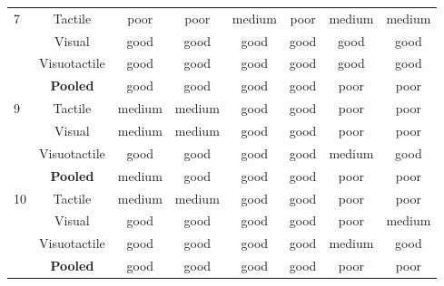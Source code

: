 \begin{longtable}{lccccccc}
7 & Tactile & \cellcolor{red!15}poor & \cellcolor{red!15}poor & \cellcolor{yellow!25}medium & \cellcolor{red!15}poor & \cellcolor{yellow!25}medium & \cellcolor{yellow!25}medium \\
 & Visual & \cellcolor{green!15}good & \cellcolor{green!15}good & \cellcolor{green!15}good & \cellcolor{green!15}good & \cellcolor{green!15}good & \cellcolor{green!15}good \\
 & Visuotactile & \cellcolor{green!15}good & \cellcolor{green!15}good & \cellcolor{green!15}good & \cellcolor{green!15}good & \cellcolor{green!15}good & \cellcolor{green!15}good \\
\textbf{} & \textbf{Pooled} & \cellcolor{green!15}good & \cellcolor{green!15}good & \cellcolor{green!15}good & \cellcolor{green!15}good & \cellcolor{red!15}poor & \cellcolor{red!15}poor \\
9 & Tactile & \cellcolor{yellow!25}medium & \cellcolor{yellow!25}medium & \cellcolor{green!15}good & \cellcolor{green!15}good & \cellcolor{red!15}poor & \cellcolor{red!15}poor \\
 & Visual & \cellcolor{yellow!25}medium & \cellcolor{yellow!25}medium & \cellcolor{green!15}good & \cellcolor{green!15}good & \cellcolor{red!15}poor & \cellcolor{red!15}poor \\
 & Visuotactile & \cellcolor{green!15}good & \cellcolor{green!15}good & \cellcolor{green!15}good & \cellcolor{green!15}good & \cellcolor{yellow!25}medium & \cellcolor{green!15}good \\
\textbf{} & \textbf{Pooled} & \cellcolor{yellow!25}medium & \cellcolor{green!15}good & \cellcolor{green!15}good & \cellcolor{green!15}good & \cellcolor{red!15}poor & \cellcolor{red!15}poor \\
10 & Tactile & \cellcolor{yellow!25}medium & \cellcolor{yellow!25}medium & \cellcolor{green!15}good & \cellcolor{green!15}good & \cellcolor{red!15}poor & \cellcolor{red!15}poor \\
 & Visual & \cellcolor{green!15}good & \cellcolor{green!15}good & \cellcolor{green!15}good & \cellcolor{green!15}good & \cellcolor{red!15}poor & \cellcolor{yellow!25}medium \\
 & Visuotactile & \cellcolor{green!15}good & \cellcolor{green!15}good & \cellcolor{green!15}good & \cellcolor{green!15}good & \cellcolor{yellow!25}medium & \cellcolor{green!15}good \\
\textbf{} & \textbf{Pooled} & \cellcolor{green!15}good & \cellcolor{green!15}good & \cellcolor{green!15}good & \cellcolor{green!15}good & \cellcolor{red!15}poor & \cellcolor{red!15}poor \\

\end{longtable}
